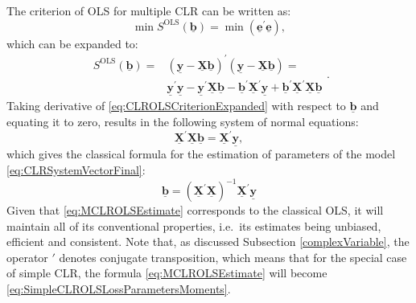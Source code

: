 \documentclass[
]{book}
\begin{document}
The criterion of OLS for multiple CLR can be written as:
\begin{equation}
    \min S^{\mathrm{OLS}}(\underline{\boldsymbol{b}}) = \min \left(\underline{\mathbf{e}}^\prime \underline{\mathbf{e}}\right),
    \label{eq:CLROLSCriterion}
\end{equation}
which can be expanded to:
\begin{equation}
    \begin{aligned}
    S^{\mathrm{OLS}}(\underline{\boldsymbol{b}}) = & \left( \underline{\mathbf{y}} - \underline{\mathbf{X}} \underline{\boldsymbol{b}} \right)^\prime \left( \underline{\mathbf{y}} - \underline{\mathbf{X}} \underline{\boldsymbol{b}} \right) = \\
    & \underline{\mathbf{y}}^\prime \underline{\mathbf{y}} - \underline{\mathbf{y}}^\prime \underline{\mathbf{X}} \underline{\boldsymbol{b}} - \underline{\boldsymbol{b}}^\prime \underline{\mathbf{X}}^\prime \underline{\mathbf{y}} + \underline{\boldsymbol{b}}^\prime \underline{\mathbf{X}}^\prime \underline{\mathbf{X}} \underline{\boldsymbol{b}}
    \end{aligned}. 
    \label{eq:CLROLSCriterionExpanded}
\end{equation}
Taking derivative of \eqref{eq:CLROLSCriterionExpanded} with respect to \(\underline{\boldsymbol{b}}\) and equating it to zero, results in the following system of normal equations:
\begin{equation}
    \underline{\mathbf{X}}^\prime \underline{\mathbf{X}} \underline{\boldsymbol{b}} = \underline{\mathbf{X}}^\prime \underline{\mathbf{y}} ,
    \label{eq:CLROLSSystemOfNormalEquations}
\end{equation}
which gives the classical formula for the estimation of parameters of the model \eqref{eq:CLRSystemVectorFinal}:
\begin{equation}
    \underline{\boldsymbol{b}} = \left( \underline{\mathbf{X}}^\prime \underline{\mathbf{X}} \right)^{-1} \underline{\mathbf{X}}^\prime \underline{\mathbf{y}}
    \label{eq:MCLROLSEstimate}
\end{equation}
Given that \eqref{eq:MCLROLSEstimate} corresponds to the classical OLS, it will maintain all of its conventional properties, i.e.~its estimates being unbiased, efficient and consistent. Note that, as discussed Subsection \ref{complexVariable}, the operator \(\prime\) denotes conjugate transposition, which means that for the special case of simple CLR, the formula \eqref{eq:MCLROLSEstimate} will become \eqref{eq:SimpleCLROLSLossParametersMoments}.
\end{document}
